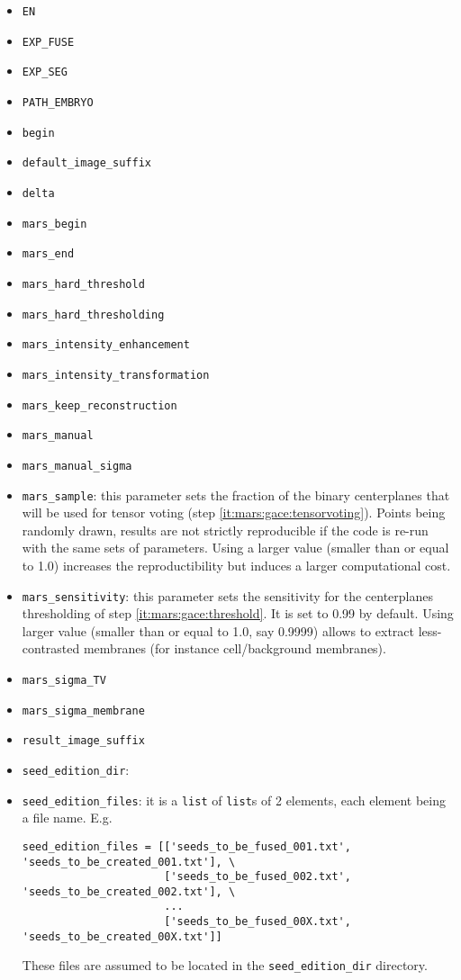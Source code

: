 \begin{itemize}
\itemsep -1ex
\item \texttt{EN}
\item \texttt{EXP\_FUSE}
\item \texttt{EXP\_SEG}
\item \texttt{PATH\_EMBRYO}
\item \texttt{begin}
\item \texttt{default\_image\_suffix}
\item \texttt{delta}
\item \texttt{mars\_begin}
\item \texttt{mars\_end}
\item \texttt{mars\_hard\_threshold}
\item \texttt{mars\_hard\_thresholding}
\item \texttt{mars\_intensity\_enhancement}
\item \texttt{mars\_intensity\_transformation}
\item \texttt{mars\_keep\_reconstruction}
\item \texttt{mars\_manual}
\item \texttt{mars\_manual\_sigma}
\item \texttt{mars\_sample}: this parameter sets the fraction of the binary centerplanes that will be used for tensor voting (step \ref{it:mars:gace:tensorvoting}). Points being randomly drawn, results are not strictly reproducible if the code is re-run with the same sets of parameters. Using a larger value (smaller than or equal to 1.0) increases the reproductibility but induces a larger computational cost.
\item \texttt{mars\_sensitivity}: this parameter sets the sensitivity for the centerplanes thresholding of step \ref{it:mars:gace:threshold}. It is set to 0.99 by default. Using larger value (smaller than or equal to 1.0, say 0.9999) allows to extract less-contrasted membranes (for instance cell/background membranes).
\item \texttt{mars\_sigma\_TV}
\item \texttt{mars\_sigma\_membrane}
\item \texttt{result\_image\_suffix}
\item \texttt{seed\_edition\_dir}:
\item \texttt{seed\_edition\_files}: it is a \texttt{list} of \texttt{list}s of 2 elements, each element being a file name. E.g.
\begin{verbatim}
seed_edition_files = [['seeds_to_be_fused_001.txt', 'seeds_to_be_created_001.txt'], \
                      ['seeds_to_be_fused_002.txt', 'seeds_to_be_created_002.txt'], \
                      ...
                      ['seeds_to_be_fused_00X.txt', 'seeds_to_be_created_00X.txt']]
\end{verbatim}
These files are assumed to be located in the \texttt{seed\_edition\_dir} directory.


\end{itemize}
